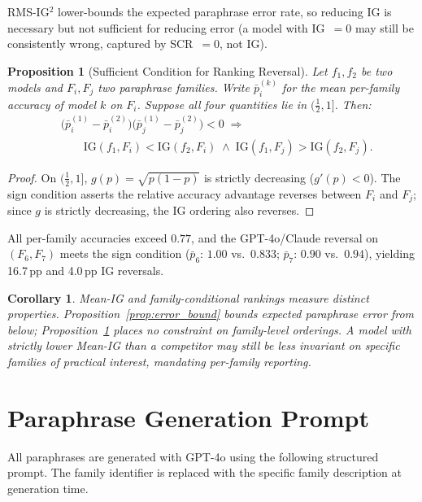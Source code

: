 \documentclass{article}
\newcommand{\IG}{\mathrm{IG}}
\newtheorem{proposition}{Proposition}
\newtheorem{corollary}[theorem]{Corollary}
\begin{document}
RMS-IG$^2$ lower-bounds the expected paraphrase error rate, so reducing IG is necessary but not sufficient for reducing error (a model with IG~$=0$ may still be consistently wrong, captured by SCR~$=0$, not IG).

\begin{proposition}[Sufficient Condition for Ranking Reversal]
\label{prop:reversal}
Let $f_1, f_2$ be two models and $F_i, F_j$ two paraphrase families.
Write $\bar{p}_i^{(k)}$ for the mean per-family accuracy of model $k$ on $F_i$.
Suppose all four quantities lie in $(\tfrac{1}{2}, 1]$. Then:
\begin{align*}
  &\bigl(\bar{p}_i^{(1)} - \bar{p}_i^{(2)}\bigr)
   \bigl(\bar{p}_j^{(1)} - \bar{p}_j^{(2)}\bigr) < 0 \;\Longrightarrow \\
  &\qquad \IG(f_1,F_i) < \IG(f_2,F_i)
   \;\wedge\;
   \IG(f_1,F_j) > \IG(f_2,F_j).
\end{align*}
\end{proposition}
\begin{proof}
On $(\tfrac{1}{2},1]$, $g(p)=\sqrt{p(1-p)}$ is strictly decreasing ($g'(p) < 0$).
The sign condition asserts the relative accuracy advantage reverses between $F_i$ and $F_j$;
since $g$ is strictly decreasing, the IG ordering also reverses.
\end{proof}

All per-family accuracies exceed $0.77$, and the GPT-4o/Claude reversal on $(F_6,F_7)$ meets the sign condition ($\bar p_6$: $1.00$ vs.\ $0.833$; $\bar p_7$: $0.90$ vs.\ $0.94$), yielding 16.7\,pp and 4.0\,pp IG reversals.

\begin{corollary}
\label{cor:reversal_het}
Mean-IG and family-conditional rankings measure distinct properties.
Proposition~\ref{prop:error_bound} bounds expected paraphrase error from below;
Proposition~\ref{prop:reversal} places no constraint on family-level orderings.
A model with strictly lower Mean-IG than a competitor may still be \emph{less} invariant
on specific families of practical interest, mandating per-family reporting.
\end{corollary}

\section{Paraphrase Generation Prompt}
\label{app:prompt}

All paraphrases are generated with GPT-4o using the following structured prompt.
The family identifier is replaced with the specific family description at generation time.
\end{document}
